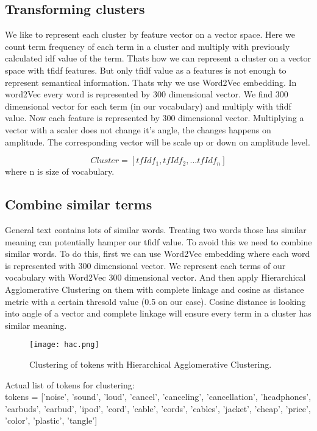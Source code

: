 \documentclass[a4paper]{article}
\begin{document}
\subsection{Transforming clusters}
We like to represent each cluster by feature vector on a vector space. Here we count term frequency of each term in a cluster and multiply with previously calculated idf value of the term. Thats how we can represent a cluster on a vector space with tfidf features. But only tfidf value as a features is not enough to represent semantical information. Thats why we use Word2Vec embedding. In word2Vec every word is represented by 300 dimensional vector. We find 300 dimensional vector for each term (in our vocabulary) and multiply with tfidf value. Now each feature is represented by 300 dimensional vector. Multiplying a vector with a scaler does not change it's angle, the changes happens on amplitude. The corresponding vector will be scale up or down on amplitude level.

$$Cluster = [tfIdf_1, tfIdf_2, ... tfIdf_n]$$
where n is size of vocabulary.

\subsection{Combine similar terms}

General text contains lots of similar words. Treating two words those has similar meaning can potentially hamper our tfidf value. To avoid this we need to combine similar words. To do this, first we can use Word2Vec embedding where each word is represented with 300 dimensional vector. We represent each terms of our vocabulary with Word2Vec 300 dimensional vector. And then apply Hierarchical Agglomerative Clustering on them with complete linkage and cosine as distance metric with a certain thresold value (0.5 on our case). Cosine distance is looking into angle of a vector and complete linkage will ensure every term in a cluster has similar meaning.\\

\begin{figure}
\centering
\texttt{[image: hac.png]}
\caption{\label{fig:hac}Clustering of tokens with Hierarchical Agglomerative Clustering.}
\end{figure}

Actual list of tokens for clustering:\\
tokens = ['noise', 'sound', 'loud', 'cancel', 'canceling', 'cancellation', 'headphones', 'earbuds', 'earbud', 'ipod', 'cord', 'cable', 'cords', 'cables', 'jacket', 'cheap', 'price', 'color', 'plastic', 'tangle']\\
\end{document}
